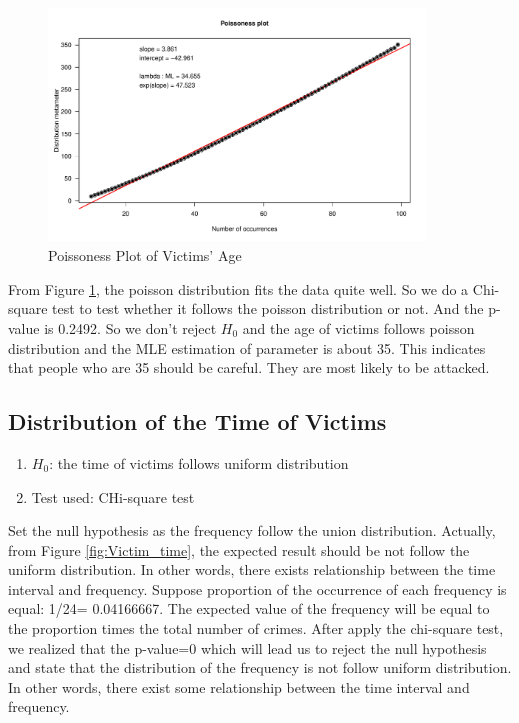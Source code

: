 \documentclass[UTF8]{article}
\begin{document}
\begin{figure}[htb]
    \includegraphics[width=10cm,height=6.18cm]{../image/3.pdf}
    \caption{Poissoness Plot of Victims' Age}\label{fig:poisson_Victim_age} 
\end{figure}

From Figure \ref{fig:poisson_Victim_age}, the poisson distribution fits the data quite well. So we do a Chi-square test to test whether it follows the poisson distribution or not. And the p-value is 0.2492. So we don't reject $H_0$ and the age of victims follows poisson distribution and the MLE estimation of parameter is about 35. This indicates that people who are 35 should be careful. They are most likely to be attacked.

\subsection{Distribution of the Time of Victims}

\begin{enumerate}[-]
    \item $H_0$: the time of victims follows uniform distribution
    \item Test used: CHi-square test
\end{enumerate}

Set the null hypothesis as the frequency follow the union distribution. Actually, from Figure \ref{fig:Victim_time}, the expected result should be not follow the uniform distribution. In other words, there exists relationship between the time interval and frequency. Suppose proportion of the occurrence of each frequency is equal: 1/24= 0.04166667. The expected value of the frequency will be equal to the proportion times the total number of crimes. After apply the chi-square test, we realized that the p-value=0 which will lead us to reject the null hypothesis and state that the distribution of the frequency is not follow uniform distribution. In other words, there exist some relationship between the time interval and frequency.
\end{document}
